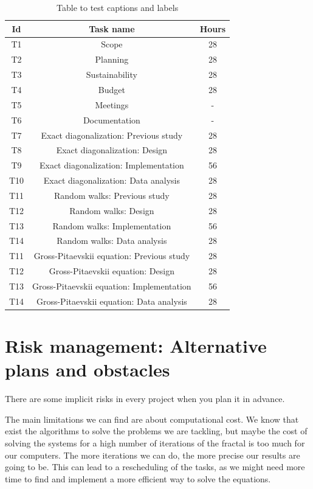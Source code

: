 \documentclass{article}
\begin{document}
\begin{table}[h!]
\centering
\begin{tabular}{|c|c|c|} 

 \hline
 Id & Task name & Hours \\
 \hline
 T1 & Scope & 28 \\
 T2 & Planning & 28 \\
 T3 & Sustainability & 28 \\
 T4 & Budget & 28 \\
 T5 & Meetings & - \\
 T6 & Documentation & - \\
 \hline
 T7 & Exact diagonalization: Previous study & 28 \\
 T8 & Exact diagonalization: Design & 28 \\
 T9 & Exact diagonalization: Implementation & 56 \\
 T10 & Exact diagonalization: Data analysis & 28 \\
 \hline
 T11 & Random walks: Previous study & 28 \\
 T12 & Random walks: Design & 28 \\
 T13 & Random walks: Implementation & 56 \\
 T14 & Random walks: Data analysis & 28 \\
 \hline
 T11 & Gross-Pitaevskii equation: Previous study & 28 \\
 T12 & Gross-Pitaevskii equation: Design & 28 \\
 T13 & Gross-Pitaevskii equation: Implementation & 56 \\
 T14 & Gross-Pitaevskii equation: Data analysis & 28 \\
 \hline
\end{tabular}
\caption{Table to test captions and labels}
\label{table:1}
\end{table}

\section{Risk management: Alternative plans and obstacles}
There are some implicit risks in every project when you plan it in advance. 

The main limitations we can find are about computational cost. We know that exist the algorithms to solve the problems we are tackling, but maybe the cost of solving the systems for a high number of iterations of the fractal is too much for our computers. The more iterations we can do, the more precise our results are going to be. This can lead to a rescheduling of the tasks, as we might need more time to find and implement a more efficient way to solve the equations. 
\end{document}
